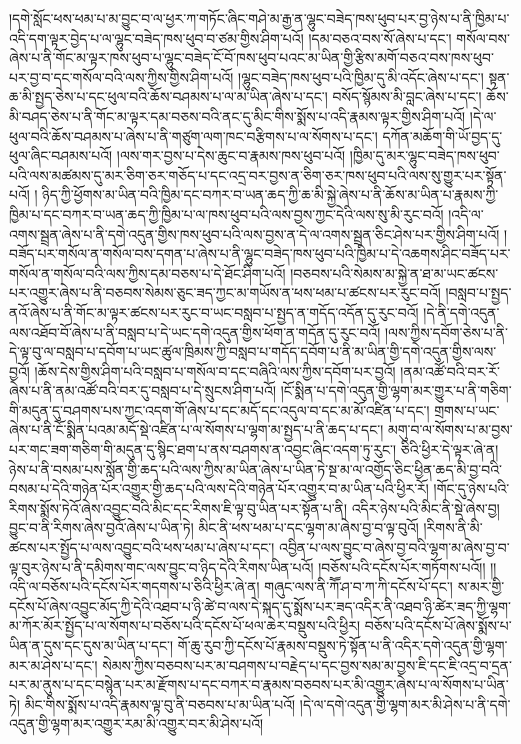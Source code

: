 །དགེ་སློང་ཕས་ཕམ་པ་མ་བྱུང་བ་ལ་ཕྱར་ཀ་གཏོང་ཞིང་གཤེ་མ་རྒྱ་ན་ལྷུང་བཟེད་ཁས་ཕུབ་པར་བྱ་ཉེས་པ་ནི་ཁྱིམ་པ་འདི་དག་ལྟར་བྱེད་པ་ལ་ལྷུང་བཟེད་ཁས་ཕུབ་བ་ཙམ་གྱིས་ཤིག་པའོ། །དམ་བཅའ་བས་སོ་ཞེས་པ་དང་། གསོལ་བས་ཞེས་པ་ནི་གོང་མ་ལྟར་ཁས་ཕུབ་པ་ལྷུང་བཟེད་ངོ་བོ་ཁས་ཕུབ་པའང་མ་ཡིན་གྱི་རྩིས་མགོ་བཅའ་བས་ཁས་ཕུབ་པར་བྱ་བ་དང་གསོལ་བའི་ལས་ཀྱིས་གྱིས་ཤིག་པའོ། །ལྷུང་བཟེད་ཁས་ཕུབ་པའི་ཁྱིམ་དུ་མི་འདོང་ཞེས་པ་དང་། སྟན་ཆ་མི་སྤྱད་ཅེས་པ་དང་ཕུལ་བའི་ཆོས་བཤམས་པ་ལ་མ་ཡིན་ཞེས་པ་དང་། བསོད་སྙོམས་མི་བླང་ཞེས་པ་དང་། ཆོས་མི་བཤད་ཅེས་པ་ནི་གོང་མ་ལྟར་དམ་བཅས་བའི་ནང་དུ་མིང་གིས་སྨོས་པ་འདི་རྣམས་ལྟར་གྱིས་ཤིག་པའོ། །དེ་ལ་ཕུལ་བའི་ཆོས་བཤམས་པ་ཞེས་པ་ནི་གཙུག་ལག་ཁང་བརྩིགས་པ་ལ་སོགས་པ་དང་། དཀོན་མཆོག་གི་ཡོ་བྱད་དུ་ཕུལ་ཞིང་བཤམས་པའོ། །ལས་གར་བྱས་པ་དེས་ཆུང་བ་རྣམས་ཁས་ཕུབ་པའོ། །ཁྱིམ་དུ་མར་ལྷུང་བཟེད་ཁས་ཕུབ་པའི་ལས་མཚམས་དུ་མར་ཅིག་ཅར་གཅོད་པ་དང་འདྲ་བར་བྱས་ན་ཅིག་ཅར་ཁས་ཕུབ་པའི་ལས་སུ་གྱུར་པར་སྟོན་པའོ། །
ཉིད་ཀྱི་ཕྱོགས་མ་ཡིན་བའི་ཁྱིམ་དང་བཀར་བ་ཡན་ཆད་ཀྱི་ཆ་མི་སྐྱེ་ཞེས་པ་ནི་ཆོས་མ་ཡིན་པ་རྣམས་ཀྱི་ཁྱིམ་པ་དང་བཀར་བ་ཡན་ཆད་ཀྱི་ཁྱིམ་པ་ལ་ཁས་ཕུབ་པའི་ལས་བྱས་ཀྱང་དེའི་ལས་སུ་མི་རུང་བའོ། །འདི་ལ་འགས་སྦྲན་ཞེས་པ་ནི་དགེ་འདུན་གྱིས་ཁས་ཕུབ་པའི་ལས་བྱས་ན་དེ་ལ་འགས་སྦྲན་ཅིང་ཤེས་པར་གྱིས་ཤིག་པའོ། །བཟོད་པར་གསོལ་ན་གསོལ་བས་དགན་པ་ཞེས་པ་ནི་ལྷུང་བཟེད་ཁས་ཕུབ་པའི་ཁྱིམ་པ་དེ་འཆགས་ཤིང་བཟོད་པར་གསོལ་ན་གསོལ་བའི་ལས་ཀྱིས་དམ་བཅས་པ་དེ་ཐོང་ཤིག་པའོ། །བཅབས་པའི་སེམས་མ་སྐྱེ་ན་ཐ་མ་ཡང་ཚངས་པར་འགྱུར་ཞེས་པ་ནི་བཅབས་སེམས་ཅུང་ཟད་ཀྱང་མ་གཡོས་ན་ཕས་ཕམ་པ་ཚངས་པར་རུང་བའོ། །བསླབ་པ་སྤྱད་ནའོ་ཞེས་པ་ནི་གོང་མ་ལྟར་ཚངས་པར་རུང་བ་ཡང་བསླབ་པ་སྤྱད་ན་གདོད་འདོན་དུ་རུང་བའོ། །དེ་ནི་དགེ་འདུན་ལས་འཐོབ་བོ་ཞེས་པ་ནི་བསླབ་པ་དེ་ཡང་དགེ་འདུན་གྱིས་ཕོག་ན་གདོན་དུ་རུང་བའོ། །ལས་ཀྱིས་དབོག་ཅེས་པ་ནི་དེ་ལྟ་བུ་ལ་བསླབ་པ་དབོག་པ་ཡང་ཚུལ་ཁྲིམས་ཀྱི་བསླབ་པ་གདོད་དབོག་པ་ནི་མ་ཡིན་གྱི་དགེ་འདུན་གྱིས་ལས་བྱའོ། །ཆོས་དེས་གྱིས་ཤིག་པའི་བསླབ་པ་གསོལ་བ་དང་བཞིའི་ལས་ཀྱིས་དབོག་པར་བྱའོ། །ནམ་འཚོ་བའི་བར་རོ་ཞེས་པ་ནི་ནམ་འཚོ་བའི་བར་དུ་བསླབ་པ་དེ་སྲུངས་ཤིག་པའོ། །ངོ་སྨིན་པ་དགེ་འདུན་གྱི་ལྷག་མར་གྱུར་པ་ནི་གཅིག་གི་མདུན་དུ་བཤགས་པས་ཀྱང་འདག་གོ་ཞེས་པ་དང་མདོ་དང་འདུལ་བ་དང་མ་མོ་འཛིན་པ་དང་། གྲགས་པ་ཡང་ཞེས་པ་ནི་ངོ་སྨིན་པའམ་མདོ་སྡེ་འཛིན་པ་ལ་སོགས་པ་ལྷག་མ་སྤྱད་པ་ནི་ཆད་པ་དང་། མགུ་བ་ལ་སོགས་པ་མ་བྱས་པར་གང་ཟག་གཅིག་གི་མདུན་དུ་སྙིང་ཐག་པ་ནས་བཤགས་ན་འབྱང་ཞིང་འདག་ཏུ་རུང་། ཅིའི་ཕྱིར་དེ་ལྟར་ཞེ་ན། ཉེས་པ་ནི་བསམ་པས་སློན་གྱི་ཆད་པའི་ལས་ཀྱིས་མ་ཡིན་ཞེས་པ་ཡིན་ཏེ་སྔ་མ་ལ་འགྱོད་ཅིང་ཕྱིན་ཆད་མི་བྱ་བའི་བསམ་པ་དེའི་གཉེན་པོར་འགྱུར་གྱི་ཆད་པའི་ལས་དེའི་གཉེན་པོར་འགྱུར་བ་མ་ཡིན་པའི་ཕྱིར་རོ། །གོང་དུ་ཉེས་པའི་རིགས་སྨོས་ཏེའོ་ཞེས་འབྱུང་བའི་མིང་དང་རིགས་ཇི་ལྟ་བུ་ཡིན་པར་སྟོན་པ་ནི། འདིར་ཉེས་པའི་མིང་ནི་སྡེ་ཞེས་བྱ། བྱུང་བ་ནི་རིགས་ཞེས་བྱའོ་ཞེས་པ་ཡིན་ཏེ། མིང་ནི་ཕས་ཕམ་པ་དང་ལྷག་མ་ཞེས་བྱ་བ་ལྟ་བུའོ། །རིགས་ནི་མི་ཚངས་པར་སྤྱོད་པ་ལས་འབྱུང་བའི་ཕས་ཕམ་པ་ཞེས་པ་དང་། འབྱིན་པ་ལས་བྱུང་བ་ཞེས་བྱ་བའི་ལྷག་མ་ཞེས་བྱ་བ་ལྟ་བུར་ཉེས་པ་ནི་དམིགས་གང་ལས་བྱུང་བ་ཉིད་དེའི་རིགས་ཡིན་པའོ། །བཅོས་པའི་དངོས་པོར་གཏོགས་པའོ།། །།འདི་ལ་བཅོས་པའི་དངོས་པོར་གདགས་པ་ཅིའི་ཕྱིར་ཞེ་ན། གཞུང་ལས་ནི་ཀཽ་ཤ་བ་ཀ་ཀི་དངོས་པོ་དང་། ས་མར་གྱི་དངོས་པོ་ཞེས་འབྱུང་མོད་ཀྱི་དེའི་འཐབ་པ་ཉི་ཚེ་བ་ལས་དེ་སྐད་དུ་སྨོས་པར་ཟད་འདིར་ནི་འཐབ་ཉི་ཚེར་ཟད་ཀྱི་ལྷག་མ་ཀོར་མོར་སྤྱོད་པ་ལ་སོགས་པ་བཅོས་པའི་དངོས་པོ་ཕལ་ཆེར་བསྡུས་པའི་ཕྱིར། བཅོས་པའི་དངོས་པོ་ཞེས་སྨོས་པ་ཡིན་ན་དུས་དང་དུས་མ་ཡིན་པ་དང་། གོ་ཆུ་རུབ་ཀྱི་དངོས་པོ་རྣམས་བསྡུས་ཏེ་སྟོན་པ་ནི་འདིར་དགེ་འདུན་གྱི་ལྷག་མར་མ་ཤེས་པ་དང་། སེམས་ཀྱིས་བཅབས་པར་མ་བཤགས་པ་བརྗེད་པ་དང་བྱས་སམ་མ་བྱས་ཇི་དང་ཇི་འདྲ་བ་དྲན་པར་མ་ནུས་པ་དང་བསྙེན་པར་མ་རྫོགས་པ་དང་བཀར་བ་རྣམས་བཅབས་པར་མི་འགྱུར་ཞེས་པ་ལ་སོགས་པ་ཡིན་ཏེ། མིང་གིས་སྨོས་པ་འདི་རྣམས་ལྟ་བུ་ནི་བཅབས་པ་མ་ཡིན་པའོ། །དེ་ལ་དགེ་འདུན་གྱི་ལྷག་མར་མི་ཤེས་པ་ནི་དགེ་འདུན་གྱི་ལྷག་མར་འགྱུར་རམ་མི་འགྱུར་བར་མི་ཤེས་པའོ། 